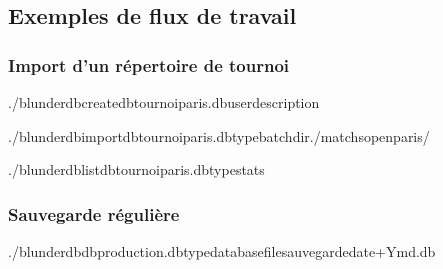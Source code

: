 \documentclass[letterpaper,10pt,french]{sphinxmanual}
\begin{document}
\subsection{Exemples de flux de travail}
\label{\detokenize{cli:exemples-de-flux-de-travail}}

\subsubsection{Import d’un répertoire de tournoi}
\label{\detokenize{cli:import-d-un-repertoire-de-tournoi}}
\begin{sphinxVerbatim}[commandchars=\\\{\}]
./blunderdbcreate\PYGZhy{}\PYGZhy{}dbtournoi\PYGZus{}paris.db\PYGZhy{}\PYGZhy{}user\PYGZhy{}\PYGZhy{}description

./blunderdbimport\PYGZhy{}\PYGZhy{}dbtournoi\PYGZus{}paris.db\PYGZhy{}\PYGZhy{}typebatch\PYGZhy{}\PYGZhy{}dir./matchs\PYGZus{}open\PYGZus{}paris/

./blunderdblist\PYGZhy{}\PYGZhy{}dbtournoi\PYGZus{}paris.db\PYGZhy{}\PYGZhy{}typestats
\end{sphinxVerbatim}


\subsubsection{Sauvegarde régulière}
\label{\detokenize{cli:sauvegarde-reguliere}}
\begin{sphinxVerbatim}[commandchars=\\\{\}]
./blunderdb\PYGZhy{}\PYGZhy{}dbproduction.db\PYGZhy{}\PYGZhy{}typedatabase\PYGZhy{}\PYGZhy{}filesauvegarde\PYGZhy{}date+\PYGZpc{}Y\PYGZpc{}m\PYGZpc{}d.db
\end{sphinxVerbatim}
\end{document}
